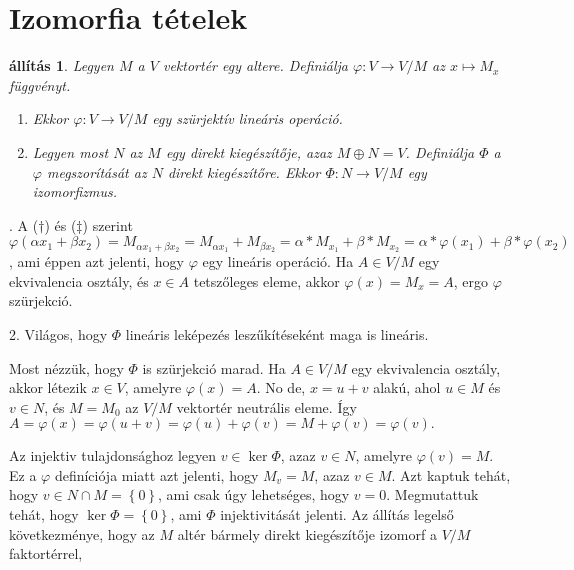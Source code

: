 \documentclass[9pt, a4paper, showtrims]{memoir}
\makeatletter
\renewenvironment{proof}[1][\proofname]
    {\par\pushQED{\qed}%
    \normalfont \topsep6\p@\@plus6\p@\relax
    \trivlist
    \item[\hskip\labelsep
        \itshape
    #1\@addpunct{:}]\ignorespaces}
    {\popQED\endtrivlist\@endpefalse}
\theoremstyle{plain}
\newtheorem{proposition}{állítás}[chapter]
\theoremstyle{remark}
\theoremstyle{definition}
\makeatother
\begin{document}
\section{Izomorfia tételek}
\begin{proposition}
	Legyen $M$ a $V$ vektortér egy altere.
	Definiálja $\varphi:V\to V/M$ az $x\mapsto M_x$ függvényt.
	\begin{enumerate}
		\item Ekkor $\varphi:V\to V/M$ egy szürjektív lineáris operáció.
		\item Legyen most $N$ az $M$ egy direkt kiegészítője,
		      azaz $M\oplus N=V$.
		      Definiálja $\Phi$ a $\varphi$ megszorítását az $N$ direkt kiegészítőre.
		      Ekkor $\Phi:N\to V/M$ egy izomorfizmus.\qedhere
	\end{enumerate}
\end{proposition}
\begin{proof}
	1. A ($\dag$) és ($\ddag$) szerint
	$
		\varphi\left( \alpha x_1+\beta x_2 \right)
		=
		M_{\alpha x_1+\beta x_2}
		=
		M_{\alpha x_1}+M_{\beta x_2}
		=
		\alpha\ast M_{x_1}+\beta\ast M_{x_2}
		=
		\alpha\ast\varphi\left( x_1 \right)+\beta\ast\varphi\left( x_2 \right)
	$,
	ami éppen azt jelenti, hogy $\varphi$ egy lineáris operáció.
	Ha $A\in V/M$ egy ekvivalencia osztály, és $x\in A$ tetszőleges eleme,
	akkor $\varphi\left( x \right)=M_x=A$, ergo $\varphi$ szürjekció.

	2. Világos, hogy $\Phi$ lineáris leképezés leszűkítéseként maga is lineáris.

	Most nézzük, hogy $\Phi$ is szürjekció marad.
	Ha $A\in V/M$ egy ekvivalencia osztály,
	akkor létezik $x\in V$, amelyre $\varphi\left( x \right)=A$.
	No de, $x=u+v$ alakú, ahol $u\in M$ és $v\in N$, és $M=M_0$ az $V/M$ vektortér neutrális eleme.
	Így
	$
		A=\varphi\left( x \right)=\varphi\left( u+v \right)=\varphi\left( u \right)+\varphi\left( v \right)
		=M+\varphi\left( v \right)=\varphi\left( v \right).
	$

	Az injektiv tulajdonsághoz legyen $v\in \ker\Phi$,
	azaz $v\in N$, amelyre $\varphi\left( v \right)=M$.
	Ez a $\varphi$ definíciója miatt azt jelenti, hogy $M_v=M$, azaz $v\in M$.
	Azt kaptuk tehát, hogy $v\in N\cap M=\left\{ 0 \right\}$,
	ami csak úgy lehetséges,
	hogy $v=0$.
	Megmutattuk tehát, hogy $\ker\Phi=\left\{ 0 \right\}$,
	ami $\Phi$ injektivitását jelenti.
\end{proof}
Az állítás legelső következménye,
hogy az $M$ altér bármely direkt kiegészítője izomorf a $V/M$ faktortérrel,
\end{document}
